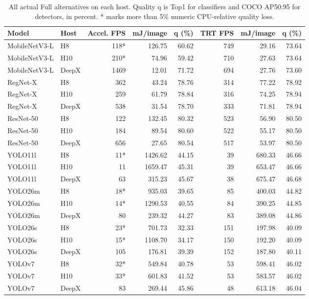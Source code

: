 \begin{table}[t]
\centering
\caption{All actual Full alternatives on each host. Quality q is Top1 for classifiers and COCO AP50:95 for detectors, in percent. * marks more than 5\% numeric CPU-relative quality loss.}
\label{tab:current-full-details}
\begingroup\small\setlength{\tabcolsep}{3pt}
\begin{tabular*}{\textwidth}{@{\extracolsep{\fill}}l l r r r r r r@{}}
\toprule
Model & Host & Accel. FPS & mJ/image & q (\%) & TRT FPS & mJ/image & q (\%) \\
\midrule
MobileNetV3-L & H8 & 118* & 126.75 & 60.62 & 749 & 29.16 & 73.64 \\
MobileNetV3-L & H10 & 210* & 74.96 & 59.42 & 710 & 27.63 & 73.64 \\
MobileNetV3-L & DeepX & 1469 & 12.01 & 71.72 & 694 & 27.76 & 73.60 \\
RegNet-X & H8 & 362 & 43.24 & 78.76 & 314 & 77.22 & 78.92 \\
RegNet-X & H10 & 259 & 61.79 & 78.84 & 316 & 74.25 & 78.94 \\
RegNet-X & DeepX & 538 & 31.54 & 78.70 & 333 & 71.81 & 78.94 \\
ResNet-50 & H8 & 122 & 132.45 & 80.32 & 523 & 56.90 & 80.50 \\
ResNet-50 & H10 & 184 & 89.54 & 80.60 & 522 & 55.17 & 80.50 \\
ResNet-50 & DeepX & 656 & 27.65 & 80.54 & 517 & 53.97 & 80.50 \\
YOLO11l & H8 & 11* & 1426.62 & 44.15 & 39 & 680.33 & 46.66 \\
YOLO11l & H10 & 11 & 1659.47 & 45.31 & 39 & 653.47 & 46.66 \\
YOLO11l & DeepX & 63 & 315.23 & 45.67 & 38 & 675.47 & 46.68 \\
YOLO26m & H8 & 18* & 935.03 & 39.65 & 85 & 400.03 & 44.82 \\
YOLO26m & H10 & 14* & 1290.53 & 40.55 & 84 & 390.25 & 44.85 \\
YOLO26m & DeepX & 80 & 239.32 & 44.27 & 83 & 389.08 & 44.86 \\
YOLO26s & H8 & 23* & 701.73 & 32.33 & 151 & 197.98 & 40.09 \\
YOLO26s & H10 & 15* & 1108.70 & 34.17 & 150 & 192.20 & 40.09 \\
YOLO26s & DeepX & 105 & 176.81 & 39.39 & 152 & 187.80 & 40.11 \\
YOLOv7 & H8 & 32* & 549.84 & 40.78 & 53 & 598.41 & 46.02 \\
YOLOv7 & H10 & 33* & 601.83 & 41.52 & 53 & 583.57 & 46.02 \\
YOLOv7 & DeepX & 83 & 269.44 & 45.86 & 48 & 613.18 & 46.04 \\
\bottomrule
\end{tabular*}
\endgroup
\end{table}
